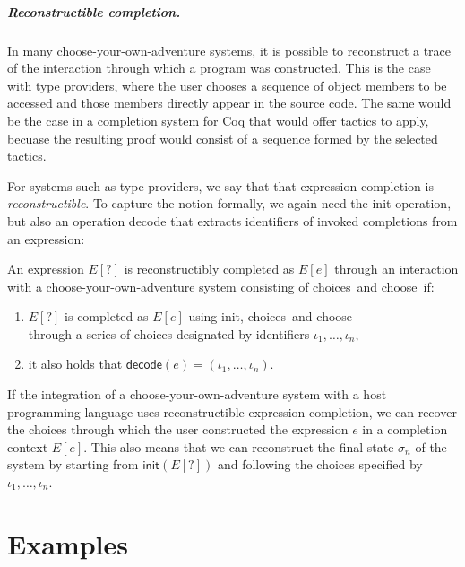 \documentclass[anonymous, a4paper,UKenglish,cleveref, autoref, thm-restate]{lipics-v2021}
\newcommand{\ident}[1]{\textsf{#1}}
\newcommand{\select}{\textnormal{\ident{choose}}}
\newcommand{\choices}{\textnormal{\ident{choices}}}
\begin{document}
\subparagraph{Reconstructible completion.}
In many choose-your-own-adventure systems, it is possible to reconstruct a trace of the interaction
through which a program was constructed. This is the case with type providers, where the user chooses
a sequence of object members to be accessed and those members directly appear in the source code.
The same would be the case in a completion system for Coq that would offer tactics to apply,
becuase the resulting proof would consist of a sequence formed by the selected tactics.

For systems such as type providers, we say that that expression completion is \emph{reconstructible}.
To capture the notion formally, we again need the \ident{init} operation, but also an operation
\ident{decode} that extracts identifiers of invoked completions from an expression:

\begin{definition}
An expression $E[?]$ is reconstructibly completed as $E[e]$ through an interaction with
a choose-your-own-adventure system consisting of \choices\ and \select\ if:

\vspace{-0.5em}
\raggedright
\begin{enumerate}
\item $E[?]$ is completed as $E[e]$ using \ident{init}, \choices\ and \select\\
  through a series of choices designated by identifiers $\iota_1, \ldots, \iota_n$,
\item it also holds that $\ident{decode}(e)=(\iota_1, \ldots, \iota_n)$.
\end{enumerate}
\end{definition}

If the integration of a choose-your-own-adventure system with a host programming language
uses reconstructible expression completion, we can recover the choices through which the user
constructed the expression $e$ in a completion context $E[e]$. This also means that we can
reconstruct the final state $\sigma_n$ of the system by starting from $\ident{init}(E[?])$
and following the choices specified by $\iota_1, \ldots, \iota_n$.


\section{Examples}
\label{sec:examples}
\end{document}
